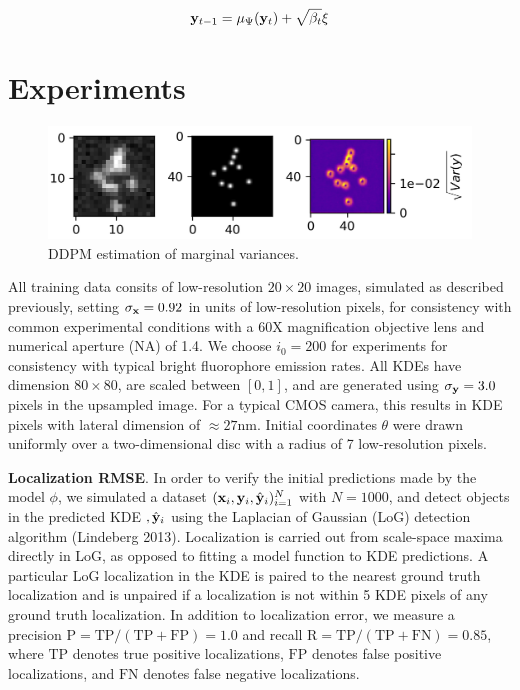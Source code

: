 \documentclass{article}
\begin{document}
\begin{equation}
\bold{y}_{t-1} = \mu_{\Psi}(\bold{y}_{t}) + \sqrt{\beta_{t}}\xi
\end{equation}


\section{Experiments}

\begin{figure}
\centering
\includegraphics[scale=1.2]{Bayes.png}
\caption{DDPM estimation of marginal variances.}
\end{figure}

All training data consits of low-resolution $20\times 20$ images, simulated as described previously, setting $\sigma_{\bold{x}}=0.92$ in units of low-resolution pixels, for consistency with common experimental conditions with a 60X magnification objective lens and numerical aperture (NA) of 1.4. We choose $i_{0}=200$ for experiments for consistency with typical bright fluorophore emission rates. All KDEs have dimension $80\times 80$, are scaled between $[0,1]$, and are generated using $\sigma_{\bold{y}}=3.0$ pixels in the upsampled image. For a typical CMOS camera, this results in KDE pixels with lateral dimension of $\approx 27\mathrm{nm}$. Initial coordinates $\theta$ were drawn uniformly over a two-dimensional disc with a radius of 7 low-resolution pixels.

\textbf{Localization RMSE}. In order to verify the initial predictions made by the model $\phi$, we simulated a dataset $(\bold{x}_i,\bold{y}_i,\hat{\bold{y}}_{i})_{i=1}^{N}$ with $N=1000$, and  detect objects in the predicted KDE $,\hat{\bold{y}}_{i}$ using the Laplacian of Gaussian (LoG) detection algorithm (Lindeberg 2013). Localization is carried out from scale-space maxima directly in LoG, as opposed to fitting a model function to KDE predictions. A particular LoG localization in the KDE is paired to the nearest ground truth localization and is unpaired if a localization is not within 5 KDE pixels of any ground truth localization. In addition to localization error, we measure a precision $\mathrm{P = TP/(TP + FP)} = 1.0$ and recall $\mathrm{R = TP/(TP + FN)} = 0.85$, where $\mathrm{TP}$ denotes true positive localizations, $\mathrm{FP}$ denotes false positive localizations, and $\mathrm{FN}$ denotes false negative localizations.
\end{document}
